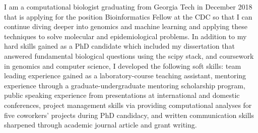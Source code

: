 

\begin{cventries}


\fontsize{10pt}{1em}\bodyfontlight\upshape\color{black}\justify
I am a computational biologist graduating from Georgia Tech in December 2018 that is applying for the position Bioinformatics Fellow at the CDC so that I can continue diving deeper into genomics and machine learning and applying these techniques to solve molecular and epidemiological problems. In addition to my hard skills gained as a PhD candidate which included my dissertation that answered fundamental biological questions using the scipy stack, and coursework in genomics and computer science, I developed the following soft skills: team leading experience gained as a laboratory-course teaching assistant, mentoring experience through a graduate-undergraduate mentoring scholarship program, public speaking experience from presentations at international and domestic conferences, project management skills via providing computational analyses for five coworkers' projects during PhD candidacy, and written communication skills sharpened through academic journal article and grant writing.
    
\vspace{-2.0mm}
\end{cventries}
